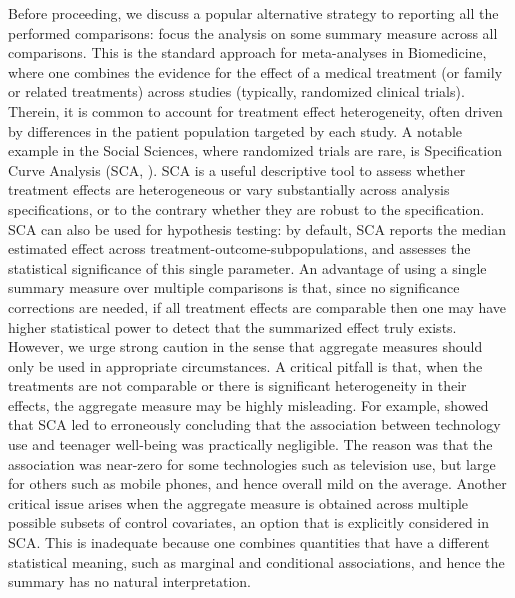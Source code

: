 \documentclass[pdflatex,sn-mathphys-num]{sn-jnl}%
\theoremstyle{thmstyleone}%
\theoremstyle{thmstyletwo}%
\theoremstyle{thmstylethree}%
\begin{document}
Before proceeding, we discuss a popular alternative strategy to reporting all the performed comparisons: focus the analysis on some summary measure across all comparisons. 
This is the standard approach for meta-analyses in Biomedicine, where one combines the evidence for the effect of a medical treatment (or family or related treatments) across studies (typically, randomized clinical trials). 
Therein, it is common to account for treatment effect heterogeneity, often driven by differences in the patient population targeted by each study.
A notable example in the Social Sciences, where randomized trials are rare, is Specification Curve Analysis (SCA, \cite{simonsohn:2020}). 
\color{blue} SCA is a useful descriptive tool to assess whether treatment effects are heterogeneous or vary substantially across analysis specifications, or to the contrary whether they are robust to the specification. SCA can also be used for hypothesis testing: \color{black}
by default, SCA reports the median estimated effect across treatment-outcome-subpopulations, and assesses the statistical significance of this single parameter.
An advantage of using a single summary measure over multiple comparisons is that, since no significance corrections are needed, if all treatment effects are comparable then one may have higher statistical power to detect that the summarized effect truly exists.
However, we urge strong caution in the sense that aggregate measures should only be used in appropriate circumstances.
A critical pitfall is that, when the treatments are not comparable or there is significant heterogeneity in their effects, the aggregate measure may be highly misleading.
For example, \cite{semken:2022} showed that SCA led \cite{orben:2019} to erroneously concluding that the association between technology use and teenager well-being was practically negligible. The reason was that the association was near-zero for some technologies such as television use, but large for others such as mobile phones, and hence overall mild on the average.
Another critical issue arises when the aggregate measure is obtained across multiple possible subsets of control covariates, an option that is explicitly considered in SCA.
This is inadequate because one combines quantities that have a different statistical meaning, such as marginal and conditional associations, and hence the summary has no natural interpretation. %
\end{document}

